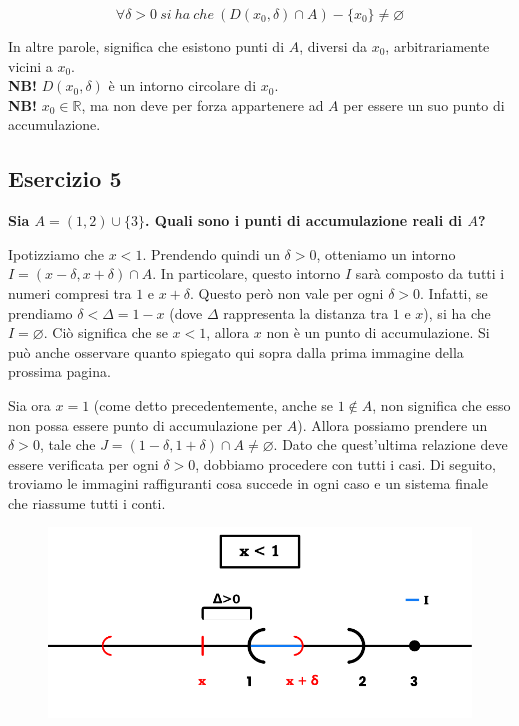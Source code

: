 \documentclass{article}
\begin{document}
\begin{equation*}
    \forall \delta > 0 \ si \ ha \ che \ (D(x_0, \delta) \cap A) - \{x_0\} \neq \varnothing
\end{equation*}

\noindent In altre parole, significa che esistono punti di $A$, diversi da $x_0$, arbitrariamente vicini a $x_0$. \\

\noindent\textbf{NB!} $D(x_0, \delta)$ è un intorno circolare di $x_0$.\\

\noindent\textbf{NB!} $x_0 \in \mathbb{R}$, ma non deve per forza appartenere ad $A$ per essere un suo punto di accumulazione.

\subsection{Esercizio 5}
\textbf{Sia $A = (1, 2) \cup \{3\}$. Quali sono i punti di accumulazione reali di $A$?}

\noindent Ipotizziamo che $x < 1$. Prendendo quindi un $\delta > 0$, otteniamo un intorno $I = (x - \delta, x + \delta) \cap A$. In particolare, questo intorno $I$ sarà composto da tutti i numeri compresi tra $1$ e $x + \delta$. Questo però non vale per ogni $\delta > 0$. Infatti, se prendiamo $\delta < \Delta = 1 - x$ (dove $\Delta$ rappresenta la distanza tra $1$ e $x$), si ha che $I = \varnothing$. Ciò significa che se $x < 1$, allora $x$ non è un punto di accumulazione. 
Si può anche osservare quanto spiegato qui sopra dalla prima immagine della prossima pagina.

\noindent Sia ora $x = 1$ (come detto precedentemente, anche se $1 \notin A$, non significa che esso non possa essere punto di accumulazione per $A$). Allora possiamo prendere un $\delta > 0$, tale che $J = (1 - \delta, 1 + \delta) \cap A \neq \varnothing$. Dato che quest'ultima relazione deve essere verificata per ogni $\delta > 0$, dobbiamo procedere con tutti i casi. Di seguito, troviamo le immagini raffiguranti cosa succede in ogni caso e un sistema finale che riassume tutti i conti.

\begin{figure}[!h]
    \centering
    \includegraphics[width=12cm]{./images/AccPoints1.pdf}
\end{figure}
\end{document}
